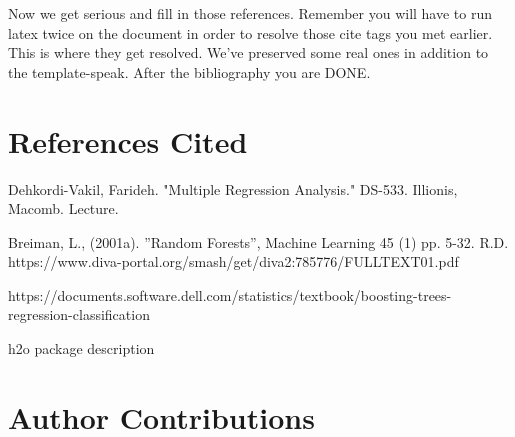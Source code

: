 \documentclass[letterpaper,twocolumn,10pt]{article}
\begin{document}
Now we get serious and fill in those references.  Remember you will
have to run latex twice on the document in order to resolve those
cite tags you met earlier.  This is where they get resolved.
We've preserved some real ones in addition to the template-speak.
After the bibliography you are DONE.

\section{References Cited}

Dehkordi-Vakil, Farideh. "Multiple Regression Analysis." DS-533. Illionis, Macomb. Lecture.

Breiman, L., (2001a). ”Random Forests”, Machine Learning 45 (1) pp. 5-32.
R.D. https://www.diva-portal.org/smash/get/diva2:785776/FULLTEXT01.pdf


https://documents.software.dell.com/statistics/textbook/boosting-trees-regression-classification

h2o package description


\section{Author Contributions}
\end{document}
